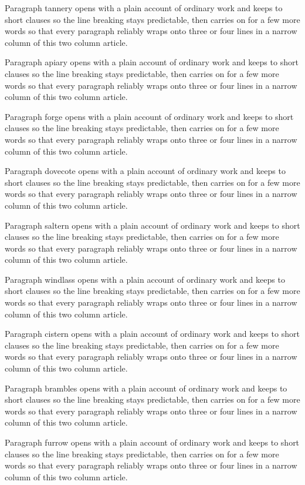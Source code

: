 \documentclass[twocolumn]{article}
\begin{document}
Paragraph tannery opens with a plain account of ordinary work and keeps to short
clauses so the line breaking stays predictable, then carries on for a few more
words so that every paragraph reliably wraps onto three or four lines in a
narrow column of this two column article.

Paragraph apiary opens with a plain account of ordinary work and keeps to short
clauses so the line breaking stays predictable, then carries on for a few more
words so that every paragraph reliably wraps onto three or four lines in a
narrow column of this two column article.

Paragraph forge opens with a plain account of ordinary work and keeps to short
clauses so the line breaking stays predictable, then carries on for a few more
words so that every paragraph reliably wraps onto three or four lines in a
narrow column of this two column article.

Paragraph dovecote opens with a plain account of ordinary work and keeps to short
clauses so the line breaking stays predictable, then carries on for a few more
words so that every paragraph reliably wraps onto three or four lines in a
narrow column of this two column article.

Paragraph saltern opens with a plain account of ordinary work and keeps to short
clauses so the line breaking stays predictable, then carries on for a few more
words so that every paragraph reliably wraps onto three or four lines in a
narrow column of this two column article.

Paragraph windlass opens with a plain account of ordinary work and keeps to short
clauses so the line breaking stays predictable, then carries on for a few more
words so that every paragraph reliably wraps onto three or four lines in a
narrow column of this two column article.

Paragraph cistern opens with a plain account of ordinary work and keeps to short
clauses so the line breaking stays predictable, then carries on for a few more
words so that every paragraph reliably wraps onto three or four lines in a
narrow column of this two column article.

Paragraph brambles opens with a plain account of ordinary work and keeps to short
clauses so the line breaking stays predictable, then carries on for a few more
words so that every paragraph reliably wraps onto three or four lines in a
narrow column of this two column article.

Paragraph furrow opens with a plain account of ordinary work and keeps to short
clauses so the line breaking stays predictable, then carries on for a few more
words so that every paragraph reliably wraps onto three or four lines in a
narrow column of this two column article.
\end{document}

